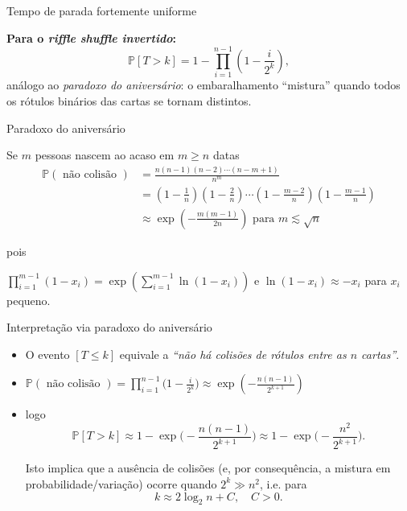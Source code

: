 \documentclass{beamer}
\def\Pr{\mathbb P}
\begin{document}
\begin{frame}{Tempo de parada  fortemente uniforme}


  \textbf{Para o \emph{riffle shuffle invertido}:}
  \[
    \Pr[T > k]
    = 1 - \prod_{i=1}^{n-1}\!\left(1 - \frac{i}{2^k}\right),
  \]
  análogo ao \emph{paradoxo do aniversário}: o embaralhamento
  ``mistura'' quando todos os rótulos binários das cartas se tornam
  distintos.

\end{frame}
  
\begin{frame}[c]{Paradoxo do aniversário}
  
  Se $m$ pessoas nascem ao acaso em $m\ge n$ datas
  \[
    \begin{aligned}
      \Pr (\text{ não  colisão }) &=
      \frac{n(n-1)(n-2)\cdots(n-m+1)}{n^m} \\&=
      \left(1-\frac{1}{n}\right) \left(1-\frac{2}{n}\right)\cdots
      \left(1-\frac{m-2}{n}\right)
      \left(1-\frac{m-1}{n}\right)\\
      &\approx
      \exp \left( -\frac{m(m-1)}{2n} \right) \text{ para } m \lesssim
      \sqrt{n} 
    \end{aligned}
  \]

  pois
  
  $\displaystyle \prod_{i=1}^{m-1}(1-x_i) = \exp \left(
    \sum_{i=1}^{m-1} \ln(1-x_i) \right)$ e $\ln(1-x_i) \approx -x_i$
  para $x_i $ pequeno.
  
\end{frame}
\begin{frame}{Interpretação via paradoxo do aniversário}

  \begin{itemize}
  \item O evento $[T \le k]$ equivale a \emph{``não há colisões de
      rótulos entre as $n$ cartas''}.
  
  \item 
    \(\displaystyle
      \Pr(\text{ não colisão }) = \prod_{i=1}^{n-1}\Big(1 -
      \frac{i}{2^k}\Big) \approx \exp\left(-\frac{n(n-1)}{2^{k+1}}
      \right)
    \)
  \item logo
\[
  \Pr[T>k] \approx 1 - \exp\Big(-\frac{n(n-1)}{2^{k+1}}\Big)
  \approx 1 - \exp\Big(-\frac{n^2}{2^{k+1}}\Big).
\]

Isto implica que a ausência de colisões (e, por consequência, a mistura em probabilidade/variação)
ocorre quando \(2^k \gg n^2\), i.e. para
\[
  k \approx 2\log_2 n + C, \quad C>0.
\]
    
\end{itemize}

\end{frame}
\end{document}
